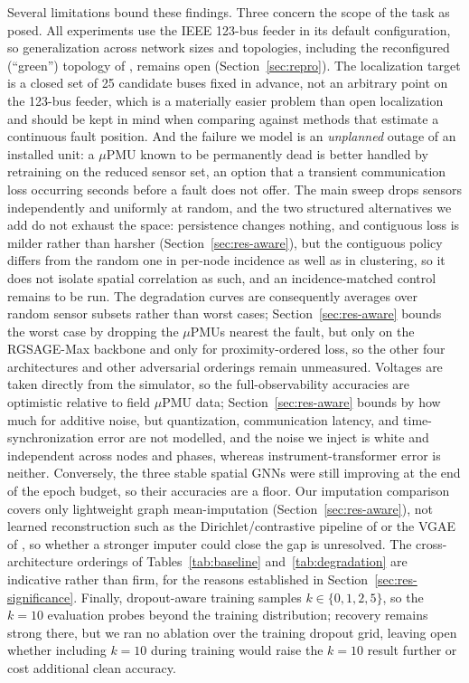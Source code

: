 \documentclass[3p,times,procedia]{elsarticle}
\begin{document}
Several limitations bound these findings. Three concern the scope of the task as posed. All experiments use the IEEE 123-bus feeder in its default configuration, so generalization across network sizes and topologies, including the reconfigured (``green'') topology of \cite{Karabulut2026}, remains open (Section~\ref{sec:repro}). The localization target is a closed set of 25 candidate buses fixed in advance, not an arbitrary point on the 123-bus feeder, which is a materially easier problem than open localization and should be kept in mind when comparing against methods that estimate a continuous fault position. And the failure we model is an \emph{unplanned} outage of an installed unit: a $\mu$PMU known to be permanently dead is better handled by retraining on the reduced sensor set, an option that a transient communication loss occurring seconds before a fault does not offer. The main sweep drops sensors independently and uniformly at random, and the two structured alternatives we add do not exhaust the space: persistence changes nothing, and contiguous loss is milder rather than harsher (Section~\ref{sec:res-aware}), but the contiguous policy differs from the random one in per-node incidence as well as in clustering, so it does not isolate spatial correlation as such, and an incidence-matched control remains to be run. The degradation curves are consequently averages over random sensor subsets rather than worst cases; Section~\ref{sec:res-aware} bounds the worst case by dropping the $\mu$PMUs nearest the fault, but only on the RGSAGE-Max backbone and only for proximity-ordered loss, so the other four architectures and other adversarial orderings remain unmeasured. Voltages are taken directly from the simulator, so the full-observability accuracies are optimistic relative to field $\mu$PMU data; Section~\ref{sec:res-aware} bounds by how much for additive noise, but quantization, communication latency, and time-synchronization error are not modelled, and the noise we inject is white and independent across nodes and phases, whereas instrument-transformer error is neither. Conversely, the three stable spatial GNNs were still improving at the end of the epoch budget, so their accuracies are a floor. Our imputation comparison covers only lightweight graph mean-imputation (Section~\ref{sec:res-aware}), not learned reconstruction such as the Dirichlet/contrastive pipeline of \cite{zhang2025} or the VGAE of \cite{fan2024}, so whether a stronger imputer could close the gap is unresolved. The cross-architecture orderings of Tables~\ref{tab:baseline} and~\ref{tab:degradation} are indicative rather than firm, for the reasons established in Section~\ref{sec:res-significance}. Finally, dropout-aware training samples $k\in\{0,1,2,5\}$, so the $k=10$ evaluation probes beyond the training distribution; recovery remains strong there, but we ran no ablation over the training dropout grid, leaving open whether including $k=10$ during training would raise the $k=10$ result further or cost additional clean accuracy.
\end{document}
